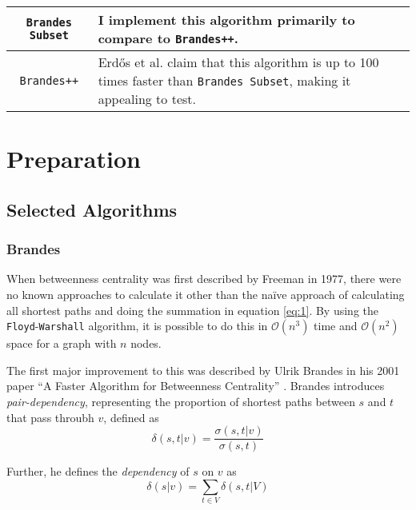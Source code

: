 \documentclass[12pt,a4paper,twoside,openright]{report}
\newcommand{\ttt}[1]{\texttt{#1}}
\newcommand{\erdos}{Erd\H{o}s }
\begin{document}
\begin{table}[H]
\begin{tabularx}{\textwidth}{|c|X|}
			\ttt{Brandes Subset} \cite{erdos} &
			
			I implement this algorithm primarily to compare to \ttt{Brandes++}.  \\ 
			\hline
			
			\ttt{Brandes++} \cite{erdos} &
			
			\erdos et al. claim that this algorithm is up to 100 times faster than \ttt{Brandes Subset}, making it appealing to test. \\ 
			\hline
		\end{tabularx}
		
	\end{table}

	\chapter{Preparation}
	
	\section{Selected Algorithms}\label{sec:algorithms}
	
	\subsection{Brandes}
	
	When betweenness centrality was first described by Freeman in 1977, there were no known approaches to calculate it other than the na\"ive approach of calculating all shortest paths and doing the summation in equation \ref{eq:1}. By using the \ttt{Floyd}-\ttt{Warshall} algorithm, it is possible to do this in $\mathcal{O}(n^3)$ time and $\mathcal{O}(n^2)$ space for a graph with $n$ nodes. 
	
	The first major improvement to this was described by Ulrik Brandes in his 2001 paper ``A Faster Algorithm for Betweenness Centrality'' \cite{brandes}. Brandes introduces \textit{pair-dependency}, representing the proportion of shortest paths between $s$ and $t$ that pass throubh $v$, defined as \begin{equation} \label{eq:pairdelta}
		\delta(s,t|v) = \frac{\sigma(s,t|v)}{\sigma(s,t)}
	\end{equation}
	
	Further, he defines the \textit{dependency} of $s$ on $v$ as \begin{equation}\label{eq:delta}
		\delta(s|v) = \sum_{t \in V} \delta(s,t|V)
	\end{equation}
	
\end{document}
